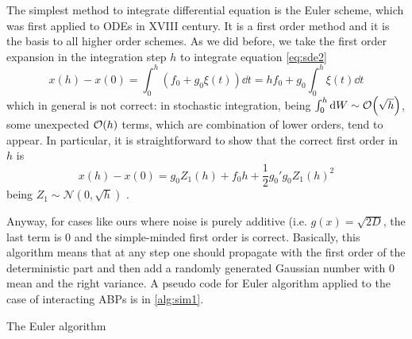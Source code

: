 \documentclass[../../master_thesis_np.tex]{subfiles}
\begin{document}
		The simplest method to integrate differential equation is the Euler scheme, which was first applied to ODEs in XVIII century. It is a first order method and it is the basis to all higher order schemes. As we did before, we take the first order expansion in the integration step $h$ to integrate equation \ref{eq:sde2}
		\begin{equation}
		x(h) - x(0) = \int_0^h (f_0 + g_0 \xi(t)) \dd{t} = h f_0 + g_0 \int_0^h \xi(t) \dd{t}
		\end{equation}
		which in general is not correct: in stochastic integration, being $\int_{0}^{h} \dd{W} \sim \order{\sqrt{h}}$, some unexpected $\order{h}$ terms, which are combination of lower orders, tend to appear. In particular, it is straightforward to show that the correct first order in $h$ is 
		\begin{equation}
		x(h) - x(0) = g_0 Z_1(h) + f_0 h + \frac{1}{2} g_0' g_0 Z_1(h)^2
		\end{equation}
		being $Z_1\sim \mathcal{N}(0,\sqrt{h})$ \cite{mannella_integration_2011}. 
		
		Anyway, for cases like ours where noise is purely additive (i.e. $g(x) = \sqrt{2D}$, the last term is $0$ and the simple-minded first order is correct. Basically, this algorithm means that at any step one should propagate with the first order of the deterministic part and then add a randomly generated Gaussian number with 0 mean and the right variance. A pseudo code for Euler algorithm applied to the case of interacting ABPs is in \ref{alg:sim1}.
		
		\begin{algorithm}
			\caption{The Euler algorithm} \label{alg:sim1}	
			\begin{algorithmic}[1]
				\EndFor
				\EndFor
				\EndFor
			\end{algorithmic}
		\end{algorithm}
		
\end{document}

